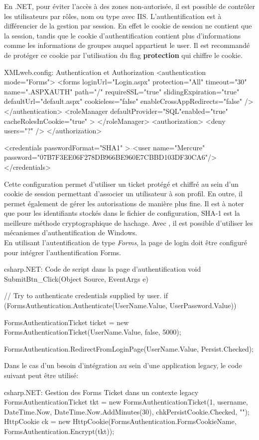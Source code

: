 En .NET, pour éviter l'accès à des zones non-autorisée, il est possible de contrôler les utilisateurs par rôles, nom ou type avec IIS. L'authentification est à différencier de la gestion par session. En effet le cookie de session ne contient que la session, tandis que le cookie d'authentification contient plus d'informations comme les informations de groupes auquel appartient le user. Il est recommandé de protéger ce cookie par l'utilisation du flag \textbf{protection} qui chiffre le cookie.
\begin{Config}{XML}{web.config: Authentication et Authorization}
  <authentication mode="Forms">
    <forms loginUrl="Login.aspx"
           protection="All" timeout="30"  name=".ASPXAUTH" path="/"
           requireSSL="true" slidingExpiration="true" defaultUrl="default.aspx"
           cookieless="false" enableCrossAppRedirects="false" />
  </authentication>
  <roleManager 
   defaultProvider="SQL"enabled="true" 
   cacheRolesInCookie="true" >
 </roleManager>
  <authorization>
    <deny users="?" />
  </authorization>
  
  <credentials passwordFormat="SHA1" >
    <user name="Mercure"
          password="07B7F3EE06F278DB966BE960E7CBBD103DF30CA6"/>
  </credentials>
\end{Config}
Cette configuration permet d'utiliser un ticket protégé et chiffré au sein d'un cookie de session permettant d'associer un utilisateur à son profil. En outre, il permet également de gérer les autorisations de manière plus fine. Il est à noter que pour les identifiants stockés dans le fichier de configuration, SHA-1 est la meilleure méthode cryptographique de hachage. Avec , il est possible d'utiliser les mécanismes d'authentification de Windows.\\
En utilisant l'autentification de type \textit{Forms}, la page de login doit être configuré pour intégrer l'authentification Forms.
\begin{Config}{csharp}{.NET: Code de script dans la page d'authentification}
    void SubmitBtn_Click(Object Source, EventArgs e)
    {
        // Try to authenticate credentials supplied by user.
        if (FormsAuthentication.Authenticate(UserName.Value, 
                UserPassword.Value))
        {
            FormsAuthenticationTicket ticket = new 
                FormsAuthenticationTicket(UserName.Value, false, 5000);
                  
            FormsAuthentication.RedirectFromLoginPage(UserName.Value,
                Persist.Checked);
        }
    }
\end{Config}

Dans le cas d'un besoin d'intégration au sein d'une application legacy, le code suivant peut être utilisé:
\begin{Config}{csharp}{.NET: Gestion des Forms Ticket dans un contexte legacy}
FormsAuthenticationTicket tkt = 
      new FormsAuthenticationTicket(1, username, 
        DateTime.Now, DateTime.Now.AddMinutes(30), 
        chkPersistCookie.Checked, "");
HttpCookie ck = 
      new HttpCookie(FormsAuthentication.FormsCookieName, FormsAuthentication.Encrypt(tkt));
\end{Config}

